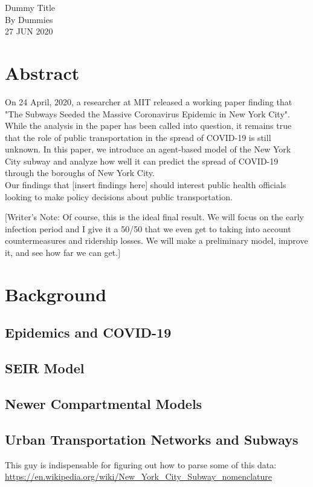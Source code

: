 \documentclass[12pt, a4, epsf] {article}
\theoremstyle{plain}
\theoremstyle{definition}
\begin{document}
\begin{center}

{\Large Dummy Title\\}
By Dummies \\
27 JUN 2020
\end{center}
\section*{Abstract}
On 24 April, 2020, a researcher at MIT released a working paper finding that "The Subways Seeded the Massive Coronavirus Epidemic in New York City". While the analysis in the paper has been called into question, it remains true that the role of public transportation in the spread of COVID-19 is still unknown. In this paper, we introduce an agent-based model of the New York City subway and analyze how well it can predict the spread of COVID-19 through the boroughs of New York City.\\

Our findings that [insert findings here] should interest public health officials looking to make policy decisions about public transportation.

[Writer's Note: Of course, this is the ideal final result. We will focus on the early infection period and I give it a 50/50 that we even get to taking into account countermeasures and ridership losses. We will make a preliminary model, improve it, and see how far we can get.]

\section*{Background}
\subsection*{Epidemics and COVID-19}
\subsection*{SEIR Model}
\subsection*{Newer Compartmental Models}
\subsection*{Urban Transportation Networks and Subways}
This guy is indispensable for figuring out how to parse some of this data:\\
\url{https://en.wikipedia.org/wiki/New_York_City_Subway_nomenclature}
\end{document}
